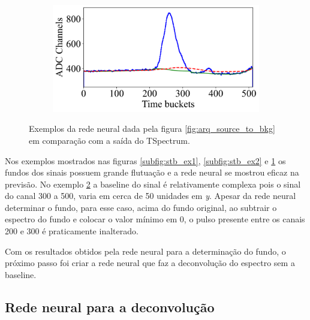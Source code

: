 \documentclass[a4paper,12pt,oneside]{book}
\begin{document}
\begin{figure}[H]
\begin{subfigure}[b]{0.47\textwidth}
        \caption{}
        \label{subfig:stb_ex3}
    \end{subfigure}%
    \hfill
    \begin{subfigure}[b]{0.46\textwidth}
        \centering
        \includegraphics[scale=0.43]{figs/stb_4.png}
        \caption{}
        \label{subfig:stb_ex4}
    \end{subfigure}
\caption{Exemplos da rede neural dada pela figura \ref{fig:arq_source_to_bkg} em comparação com a saída do TSpectrum.}
\label{fig:stb_examples}
\end{figure}

\par Nos exemplos mostrados nas figuras \ref{subfig:stb_ex1}, \ref{subfig:stb_ex2} e \ref{subfig:stb_ex3} os fundos dos sinais possuem grande flutuação e a rede neural se mostrou eficaz na previsão. No exemplo \ref{subfig:stb_ex4} a baseline do sinal é relativamente complexa pois o sinal do canal 300 a 500, varia em cerca de 50 unidades em \textit{y}. Apesar da rede neural determinar o fundo, para esse caso, acima do fundo original, ao subtrair o espectro do fundo e colocar o valor mínimo em 0, o pulso presente entre os canais 200 e 300 é praticamente inalterado.

\par Com os resultados obtidos pela rede neural para a determinação do fundo, o próximo passo foi criar a rede neural que faz a deconvolução do espectro sem a baseline.

\subsection{Rede neural para a deconvolução}\label{subsec:pulso_ml_deconv}

\end{document}
